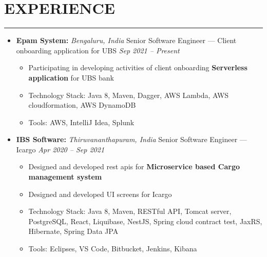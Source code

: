 \documentclass{article}
\begin{document}
	\section*{\normalsize EXPERIENCE}
	\rule{\textwidth}{1.6pt}
		\begin{itemize}
			\item \textbf{Epam System:} \hfill \textit{Bengaluru, India} \newline Senior Software Engineer — Client onboarding application for UBS \hfill \textit{Sep 2021 – Present}
			\begin{itemize}
				\item Participating in developing activities of client onboarding \textbf{Serverless application} for UBS bank
				\item Technology Stack: Java 8, Maven, Dagger, AWS Lambda, AWS cloudformation, AWS DynamoDB
				\item Tools: AWS, IntelliJ Idea, Splunk
			\end{itemize}
		\end{itemize}
		\begin{itemize}
			\item \textbf{IBS Software:} \hfill \textit{Thiruvananthapuram, India} \newline Senior Software Engineer — Icargo \hfill \textit{Apr 2020 – Sep 2021}
			\begin{itemize}
				\item Designed and developed rest apis for \textbf{Microservice based Cargo management system}
				\item Designed and developed UI screens for Icargo
				\item Technology Stack: Java 8, Maven, RESTful API, Tomcat server, PostgreSQL, React, Liquibase, NestJS, Spring cloud contract test, JaxRS, Hibernate, Spring Data JPA
				\item Tools: Eclipses, VS Code, Bitbucket, Jenkins, Kibana
			\end{itemize}
		\end{itemize}
\end{document}

